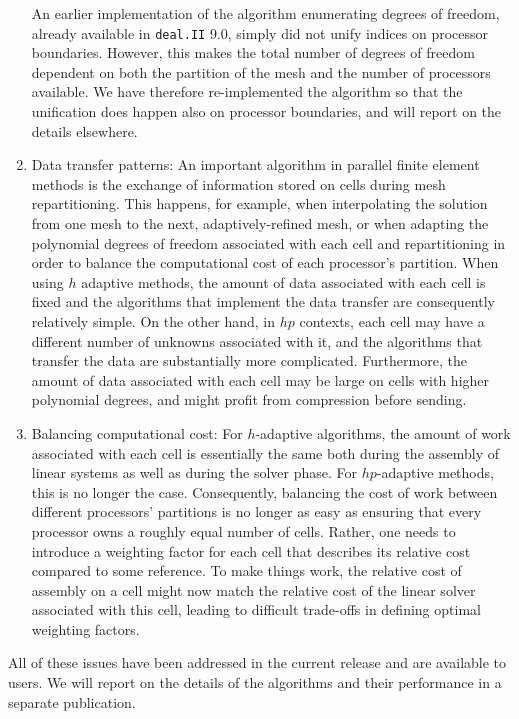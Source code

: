\documentclass{ansarticle-preprint}
\newcommand{\specialword}[1]{\texttt{#1}}
\newcommand{\dealii}{{\specialword{deal.II}}\xspace}
\begin{document}
\begin{enumerate}
  An earlier implementation of the algorithm enumerating degrees of
  freedom, already available in \dealii{} 9.0, simply did not unify
  indices on processor boundaries. However, this makes the total
  number of degrees of freedom dependent on both the partition of the
  mesh and the number of processors available. We have therefore
  re-implemented the algorithm so that the unification does happen
  also on processor boundaries, and will report on the details
  elsewhere.
  
\item Data transfer patterns: An important algorithm in parallel
  finite element methods is the exchange of information stored on
  cells during mesh repartitioning. This happens, for example, when
  interpolating the solution from one mesh to the next,
  adaptively-refined mesh, or when adapting the polynomial degrees of
  freedom associated with each cell and repartitioning in order to
  balance the computational cost of each processor's partition. When
  using $h$ adaptive methods, the amount of data associated with each
  cell is fixed and the algorithms that implement the data transfer
  are consequently relatively simple. On the other hand, in $hp$
  contexts, each cell may have a different number of unknowns
  associated with it, and the algorithms that transfer the data are
  substantially more complicated. Furthermore, the amount of data
  associated with each cell may be large on cells with higher
  polynomial degrees, and might profit from compression before
  sending.

\item Balancing computational cost: For $h$-adaptive algorithms, the
  amount of work associated with each cell is essentially the same
  both during the assembly of linear systems as well as during the
  solver phase. For $hp$-adaptive methods, this is no longer the
  case. Consequently, balancing the cost of work between different
  processors' partitions is no longer as easy as ensuring that every
  processor owns a roughly equal number of cells. Rather, one needs to
  introduce a weighting factor for each cell that describes its
  relative cost compared to some reference. To make things work, the
  relative cost of assembly on a cell might now match the relative
  cost of the linear solver associated with this cell, leading to
  difficult trade-offs in defining optimal weighting factors.
\end{enumerate}

All of these issues have been addressed in the current release and are
available to users. We will report on the details of the algorithms
and their performance in a separate publication.
\end{document}
